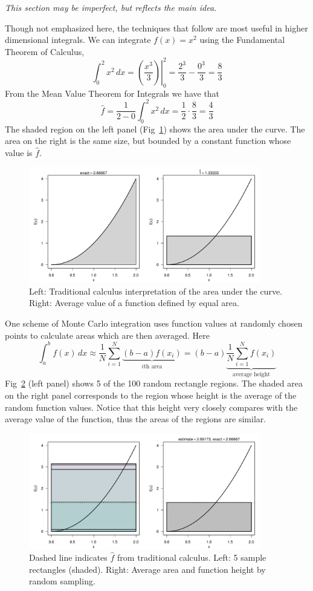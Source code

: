 \documentclass[11pt]{article}
\begin{document}
\textit{This section may be imperfect, but reflects the main idea.}

Though not emphasized here, the techniques that follow are most useful in higher dimensional integrals. We can integrate \(f(x) = x^2\) using the Fundamental Theorem of Calculus,
\[\int_0^2 x^2\,dx = \left.\left(\dfrac{x^3}{3}\right)\right|_0^2 = \dfrac{2^3}{3} - \dfrac{0^3}{3} = \dfrac{8}{3}\]
From the Mean Value Theorem for Integrals we have that \[\hat{f} = \dfrac{1}{2-0}\int_0^2 x^2\,dx = \dfrac{1}{2}\cdot \dfrac{8}{3} = \dfrac{4}{3}\]
The shaded region on the left panel (Fig~\ref{fig::calc}) shows the area under the curve. The area on the right is the same size, but bounded by a constant function whose value is \(\hat{f}\).

\begin{figure}[h!]\centering
\includegraphics[width=0.9\textwidth]{intro.pdf}
\caption{Left: Traditional calculus interpretation of the area under the curve. Right: Average value of a function defined by equal area.}\label{fig::calc}
\end{figure}

One scheme of Monte Carlo integration uses function values at randomly chosen points to calculate areas which are then averaged. Here \[\int_a^b f(x)\,dx \approx \dfrac{1}{N}\sum_{i=1}^{N} \underbrace{(b-a)f(x_i)}_\text{\(i\)th area} = (b-a)\underbrace{\dfrac{1}{N}\sum_{i=1}^{N} f(x_i)}_\text{average height}\] Fig~\ref{fig::average} (left panel) shows 5 of the 100 random rectangle regions. The shaded area on the right panel corresponds to the region whose height is the average of the random function values. Notice that this height very closely compares with the average value of the function, thus the areas of the regions are similar.
%
\begin{figure}[h!]\centering
\includegraphics[width=0.9\textwidth]{rectangles.pdf}
\caption{Dashed line indicates \(\hat{f}\) from traditional calculus. Left: 5 sample rectangles (shaded). Right: Average area and function height by random sampling.}\label{fig::average}
\end{figure}
\end{document}
